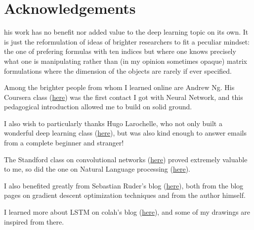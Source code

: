 \chapter{Acknowledgements}

his work has no benefit nor added value to the deep learning topic on its own. It is just the reformulation of ideas of brighter researchers to fit a peculiar mindset: the one of prefering formulas with ten indices but where one knows precisely what one is manipulating rather than (in my opinion sometimes opaque) matrix formulations where the dimension of the objects are rarely if ever specified. 

\vspace{0.2cm}

Among the brighter people from whom I learned online are Andrew Ng. His Coursera class (\href{https://www.coursera.org/learn/machine-learning}{here}) was the first contact I got with Neural Network, and this pedagogical introduction allowed me to build on solid ground. 

\vspace{0.2cm}

I also wish to particularly thanks Hugo Larochelle, who not only built a wonderful deep learning class (\href{http://info.usherbrooke.ca/hlarochelle/neural_networks/content.html}{here}), but was also kind enough to answer emails from a complete beginner and stranger!

\vspace{0.2cm}

The Standford class on convolutional networks (\href{http://cs231n.github.io/convolutional-networks/}{here}) proved extremely valuable to me, so did the one on Natural Language processing (\href{http://web.stanford.edu/class/cs224n/}{here}). 

\vspace{0.2cm}

I also benefited greatly from Sebastian Ruder's blog (\href{http://ruder.io/#open}{here}), both from the blog pages on gradient descent optimization techniques and from the author himself. 

\vspace{0.2cm}

I learned more about LSTM on colah's blog (\href{http://colah.github.io/posts/2015-08-Understanding-LSTMs/}{here}), and some of my drawings are inspired from there.

\vspace{0.2cm}

